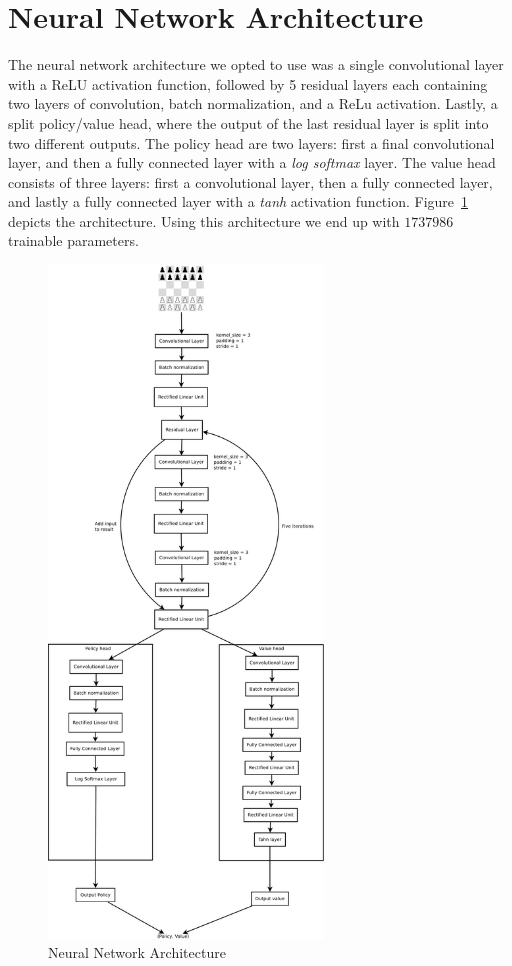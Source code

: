 \section{Neural Network Architecture}

The neural network architecture we opted to use was a single convolutional layer with a ReLU activation function, followed by 5 residual layers each containing two layers of convolution, batch normalization, and a ReLu activation. Lastly, a split policy/value head, where the output of the last residual layer is split into two different outputs. The policy head are two layers: first a final convolutional layer, and then a fully connected layer with a \textit{log softmax} layer. The value head consists of three layers: first a convolutional layer, then a fully connected layer, and lastly a fully connected layer with a \textit{tanh} activation function. Figure~\ref{fig:nnarch} depicts the architecture. Using this architecture we end up with $1737986$ trainable parameters.

\begin{figure}[]
    \centering

    \includegraphics[width=0.65\textwidth]{graphics/test}

    \caption{Neural Network Architecture}
    \label{fig:nnarch}
\end{figure}


